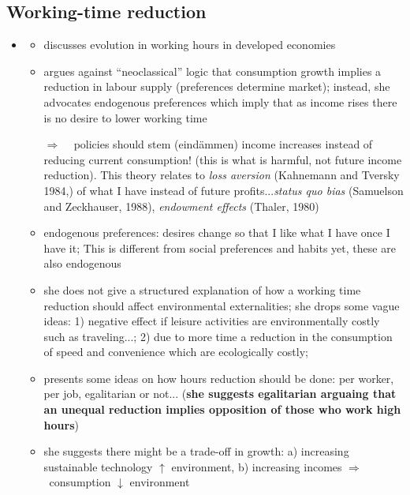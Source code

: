 \documentclass[12pt]{article}
\newcommand{\ar}{$\Rightarrow$ \ }
\begin{document}
\subsection{Working-time reduction}
\begin{itemize}
\item \cite{Schor2005SustainableReduction}
\begin{itemize}
\item discusses evolution in working hours in developed economies
\item argues against ``neoclassical'' logic that consumption growth implies a reduction in labour supply (preferences determine market); instead, she advocates endogenous preferences which imply that as income rises there is no desire to lower working time 
\item[\ar] policies should stem (eindämmen) income increases instead of reducing current consumption! (this is what is harmful, not future income reduction). This theory relates to \textit{loss aversion} (Kahnemann and Tversky 1984,) of what I have instead of future profits...\textit{status quo bias} (Samuelson and Zeckhauser, 1988), \textit{endowment effects} (Thaler, 1980)
\item endogenous preferences: desires change so that I like what I have once I have it; This is different from social preferences and habits yet, these are also endogenous  
\item she does not give a structured explanation of how a working time reduction should affect environmental externalities; she drops some vague ideas: 1) negative effect if leisure activities are environmentally costly such as traveling...; 2) due to more time a reduction in the consumption of speed and convenience which are ecologically costly;
\item presents some ideas on how hours reduction should be done: per worker, per job, egalitarian or not... (\textbf{she suggests egalitarian arguaing that an unequal reduction implies opposition of those who work high hours})
\item she suggests there might be a trade-off in growth: a) increasing sustainable technology $\uparrow$ environment, b) increasing incomes \ar consumption $\downarrow$ environment
\end{itemize}


\end{itemize}
\end{document}
